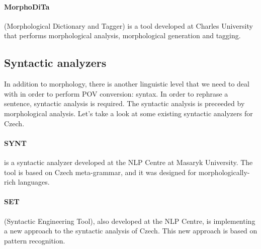 \paragraph{MorphoDiTa} (Morphological Dictionary and Tagger) is a tool developed at Charles University that performs morphological analysis, morphological generation and tagging. \cite{strakova14}

\subsection{Syntactic analyzers}
\label{sec:synt-an}

In addition to morphology, there is another linguistic level that we need to deal with in order to perform POV conversion: syntax. In order to rephrase a sentence, syntactic analysis is required. The syntactic analysis is preceeded by morphological analysis. Let's take a look at some existing syntactic analyzers for Czech.

\paragraph{SYNT} is a syntactic analyzer developed at the NLP Centre at Masaryk University. The tool is based on Czech meta-grammar, and it was designed for morphologically-rich languages.

\paragraph{SET} (Syntactic Engineering Tool), also developed at the NLP Centre, is implementing a new approach to the syntactic analysis of Czech. This new approach is based on pattern recognition. \cite{set}

